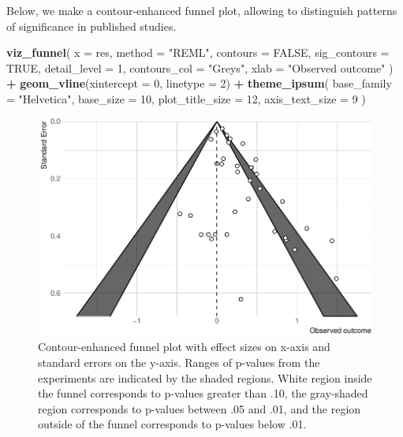 \documentclass[floatsintext,doc]{apa6}
\newenvironment{Shaded}{\begin{snugshade}}{\end{snugshade}}
\newcommand{\DataTypeTok}[1]{\textcolor[rgb]{0.13,0.29,0.53}{#1}}
\newcommand{\DecValTok}[1]{\textcolor[rgb]{0.00,0.00,0.81}{#1}}
\newcommand{\KeywordTok}[1]{\textcolor[rgb]{0.13,0.29,0.53}{\textbf{#1}}}
\newcommand{\NormalTok}[1]{#1}
\newcommand{\OperatorTok}[1]{\textcolor[rgb]{0.81,0.36,0.00}{\textbf{#1}}}
\newcommand{\OtherTok}[1]{\textcolor[rgb]{0.56,0.35,0.01}{#1}}
\newcommand{\StringTok}[1]{\textcolor[rgb]{0.31,0.60,0.02}{#1}}
\begin{document}
Below, we make a contour-enhanced funnel plot, allowing to distinguish patterns of significance in published studies.

\begin{Shaded}
\begin{Highlighting}[]
\KeywordTok{viz_funnel}\NormalTok{(}
    \DataTypeTok{x =}\NormalTok{ res, }\DataTypeTok{method =} \StringTok{"REML"}\NormalTok{,}
    \DataTypeTok{contours =} \OtherTok{FALSE}\NormalTok{, }\DataTypeTok{sig_contours =} \OtherTok{TRUE}\NormalTok{, }\DataTypeTok{detail_level =} \DecValTok{1}\NormalTok{,}
    \DataTypeTok{contours_col =} \StringTok{"Greys"}\NormalTok{,}
    \DataTypeTok{xlab =} \StringTok{"Observed outcome"}
\NormalTok{    ) }\OperatorTok{+}
\StringTok{    }\KeywordTok{geom_vline}\NormalTok{(}\DataTypeTok{xintercept =} \DecValTok{0}\NormalTok{, }\DataTypeTok{linetype =} \DecValTok{2}\NormalTok{) }\OperatorTok{+}
\StringTok{    }\KeywordTok{theme_ipsum}\NormalTok{(}
        \DataTypeTok{base_family =} \StringTok{"Helvetica"}\NormalTok{,}
        \DataTypeTok{base_size =} \DecValTok{10}\NormalTok{, }\DataTypeTok{plot_title_size =} \DecValTok{12}\NormalTok{, }\DataTypeTok{axis_text_size =} \DecValTok{9}
\NormalTok{        )}
\end{Highlighting}
\end{Shaded}

\begin{figure}[H]

{\centering \includegraphics[width=0.75\linewidth]{supplementary_materials_files/figure-latex/funnel2-1} 

}

\caption{Contour-enhanced funnel plot with effect sizes on x-axis and standard errors on the y-axis. Ranges of p-values from the experiments are indicated by the shaded regions. White region inside the funnel corresponds to p-values greater than .10, the gray-shaded region corresponds to p-values between .05 and .01, and the region outside of the funnel corresponds to p-values below .01.}\label{fig:funnel2}
\end{figure}
\end{document}
